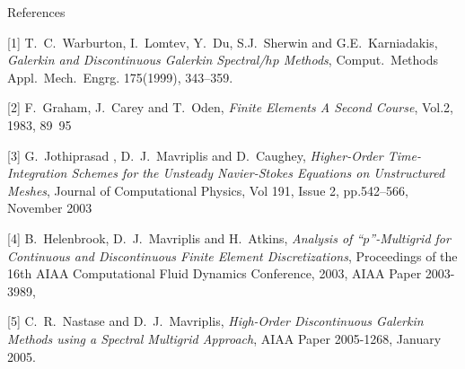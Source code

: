 \documentclass{report}
\begin{document}
References

[1] T.~C.~Warburton, I.~Lomtev, Y.~Du, S.J.~Sherwin and
G.E.~Karniadakis,
{\em Galerkin and Discontinuous Galerkin Spectral/$hp$ Methods},
Comput.~Methods Appl.~Mech.~Engrg. 175(1999), 343--359.

[2] F.~Graham, J.~Carey and T.~Oden,
{\em Finite Elements A Second Course},
Vol.2, 1983, 89~95

[3] G.~Jothiprasad , D.~J.~Mavriplis and D.~Caughey,
{\em Higher-Order
Time-Integration Schemes for the Unsteady Navier-Stokes Equations on
Unstructured Meshes}, Journal of Computational Physics, Vol 191, Issue
2, pp.542--566, November 2003

[4] B.~Helenbrook, D.~J.~Mavriplis and H.~Atkins,
{\em Analysis of
``$p$''-Multigrid for Continuous and Discontinuous Finite Element
Discretizations}, Proceedings of the 16th AIAA Computational Fluid
Dynamics Conference, 2003, AIAA Paper 2003-3989,

[5] C.~R.~Nastase and D.~J.~Mavriplis,
{\em High-Order Discontinuous
Galerkin Methods using a Spectral Multigrid Approach}, AIAA Paper
2005-1268, January 2005.
\end{document}
